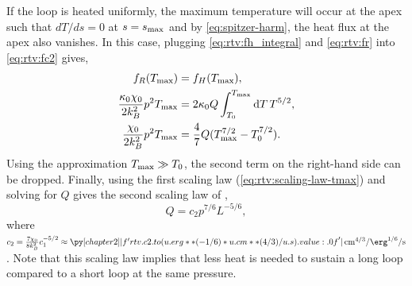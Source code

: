 If the loop is heated uniformly, the maximum temperature will occur at the apex such that $dT/ds=0$ at $s=s_\textup{max}$ and by \autoref{eq:spitzer-harm}, the heat flux at the apex also vanishes. In this case, plugging \autoref{eq:rtv:fh_integral} and \autoref{eq:rtv:fr} into \autoref{eq:rtv:fc2} gives,
\begin{align}
    f_R(T_\textup{max}) &= f_H(T_\textup{max}), \nonumber \\
    \frac{\kappa_0\chi_0}{2k_B^2}p^2T_\textup{max} &= 2\kappa_0Q\int_{T_0}^{T_\textup{max}}\textup{d}T\, T^{5/2}, \nonumber \\
    \frac{\chi_0}{2k_B^2}p^2T_\textup{max} &= \frac{4}{7}Q(T_\textup{max}^{7/2} - T_0^{7/2}).
\end{align}
Using the approximation $T_\textup{max}\gg T_0$, the second term on the right-hand side can be dropped. Finally, using the first scaling law (\autoref{eq:rtv:scaling-law-tmax}) and solving for $Q$ gives the second scaling law of \citet{rosner_dynamics_1978},
\begin{equation}\label{eq:rtv:scaling-law-heat}
    Q = c_2 p^{7/6}L^{-5/6},
\end{equation}
where $c_2=\frac{7\chi_0}{8k_B^2}c_1^{-5/2}\approx\py[chapter2]|f'{rtv.c2.to(u.erg**(-1/6)*u.cm**(4/3)/u.s).value:.0f}'|\,\si{\cm\tothe{4/3}\per\erg\tothe{1/6}\per\second}$. Note that this scaling law implies that less heat is needed to sustain a long loop compared to a short loop at the same pressure.

